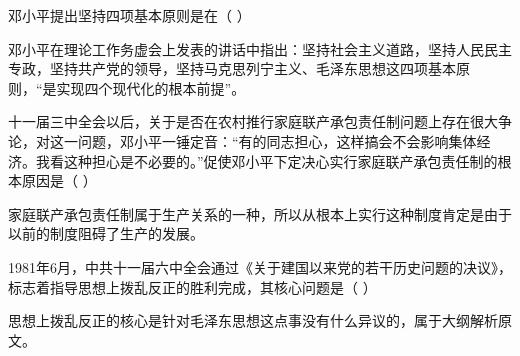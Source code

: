 \question 邓小平提出坚持四项基本原则是在（ ）
\par{}
\begin{solution}邓小平在理论工作务虚会上发表的讲话中指出：坚持社会主义道路，坚持人民民主专政，坚持共产党的领导，坚持马克思列宁主义、毛泽东思想这四项基本原则，``是实现四个现代化的根本前提''。
\end{solution}
\question 十一届三中全会以后，关于是否在农村推行家庭联产承包责任制问题上存在很大争论，对这一问题，邓小平一锤定音：``有的同志担心，这样搞会不会影响集体经济。我看这种担心是不必要的。''促使邓小平下定决心实行家庭联产承包责任制的根本原因是（
）
\par{}
\begin{solution}家庭联产承包责任制属于生产关系的一种，所以从根本上实行这种制度肯定是由于以前的制度阻碍了生产的发展。
\end{solution}
\question 1981年6月，中共十一届六中全会通过《关于建国以来党的若干历史问题的决议》，标志着指导思想上拨乱反正的胜利完成，其核心问题是（
）
\par{}
\begin{solution}思想上拨乱反正的核心是针对毛泽东思想这点事没有什么异议的，属于大纲解析原文。
\end{solution}
